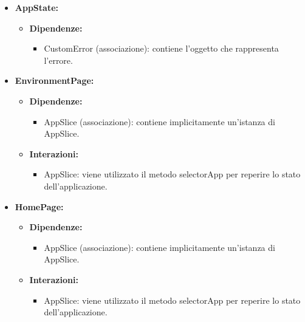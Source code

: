 \begin{itemize}
      \item \textbf{AppState:}
            \begin{itemize}
                  \item \textbf{Dipendenze:}
                        \begin{itemize}
                              \item CustomError (associazione): contiene l'oggetto che rappresenta l'errore.
                        \end{itemize}
            \end{itemize}

      \item \textbf{EnvironmentPage:}
            \begin{itemize}
                  \item \textbf{Dipendenze:}
                        \begin{itemize}
                              \item AppSlice (associazione): contiene implicitamente un'istanza di AppSlice.
                        \end{itemize}
                  \item \textbf{Interazioni:}
                        \begin{itemize}
                              \item AppSlice: viene utilizzato il metodo selectorApp per reperire lo stato
                                    dell'applicazione.
                        \end{itemize}
            \end{itemize}

      \item \textbf{HomePage:}
      \begin{itemize}
            \item \textbf{Dipendenze:}
                  \begin{itemize}
                        \item AppSlice (associazione): contiene implicitamente un'istanza di AppSlice.
                  \end{itemize}
            \item \textbf{Interazioni:}
                  \begin{itemize}
                        \item AppSlice: viene utilizzato il metodo selectorApp per reperire lo stato
                              dell'applicazione.
                  \end{itemize}
      \end{itemize}


\end{itemize}
